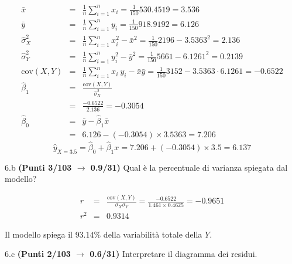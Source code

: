 \documentclass[
  11pt,
]{book}
\theoremstyle{mytheoremstyle}
\theoremstyle{mydefstyle}
\newenvironment{sol}
  {
  \begin{tcolorbox}[enhanced,breakable,arc=0.1mm,boxrule=1pt,colback=white,colframe=iblue,
  title=\bf \fontfamily{lmss}\selectfont \hspace{.5 cm} Soluzione,drop fuzzy shadow]

}{
\end{tcolorbox}
  }
\begin{document}
\begin{sol}
\begin{eqnarray*}
           \bar x &=&\frac 1 n\sum_{i=1}^n x_i = \frac {1}{ 150 }  530.4519 =  3.536 \\
           \bar y &=&\frac 1 n\sum_{i=1}^n y_i = \frac {1}{ 150 }  918.9192 =  6.126 \\
           \hat\sigma_X^2&=&\frac 1 n\sum_{i=1}^n x_i^2-\bar x^2=\frac {1}{ 150 }  2196  - 3.5363 ^2= 2.136 \\
           \hat\sigma_Y^2&=&\frac 1 n\sum_{i=1}^n y_i^2-\bar y^2=\frac {1}{ 150 }  5661  - 6.1261 ^2= 0.2139 \\
           \text{cov}(X,Y)&=&\frac 1 n\sum_{i=1}^n x_i~y_i-\bar x\bar y=\frac {1}{ 150 }  3152 - 3.5363 \cdot 6.1261 = -0.6522 \\
           \hat\beta_1 &=& \frac{\text{cov}(X,Y)}{\hat\sigma_X^2} \\
                    &=& \frac{ -0.6522 }{ 2.136 }  =  -0.3054 \\
           \hat\beta_0 &=& \bar y - \hat\beta_1 \bar x\\
                    &=&  6.126 - (-0.3054) \times  3.5363 = 7.206 
         \end{eqnarray*}\[\hat y_{X= 3.5 }=\hat\beta_0+\hat\beta_1 x= 7.206 + (-0.3054) \times 3.5 = 6.137 \]

\end{sol}

6.b \textbf{(Punti 3/103 \(\rightarrow\) 0.9/31)} Qual è la percentuale di varianza spiegata dal modello?

\begin{sol}
\begin{eqnarray*}
r&=&\frac{\text{cov}(X,Y)}{\sigma_X\sigma_Y}=\frac{ -0.6522 }{ 1.461 \times 0.4625 }= -0.9651 \\ 
r^2&=& 0.9314\end{eqnarray*}

Il modello spiega il \(93.14\%\) della variabilità totale della \(Y\).

\end{sol}

6.c \textbf{(Punti 2/103 \(\rightarrow\) 0.6/31)} Interpretare il diagramma dei residui.
\end{document}
